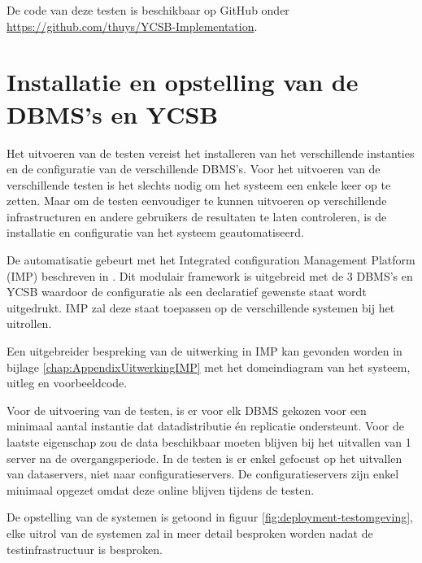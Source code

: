 De code van deze testen is beschikbaar op GitHub onder  \url{https://github.com/thuys/YCSB-Implementation}. 

\section{Installatie en opstelling van de DBMS's en YCSB}
Het uitvoeren van de testen vereist het installeren van het verschillende instanties en de configuratie van de verschillende DBMS's. Voor het uitvoeren van de verschillende testen is het slechts nodig om het systeem een enkele keer op te zetten. Maar om de testen eenvoudiger te kunnen uitvoeren op verschillende infrastructuren en andere gebruikers de resultaten te laten controleren, is de installatie en configuratie van het systeem geautomatiseerd. 

De automatisatie gebeurt met het Integrated configuration Management Platform (IMP) beschreven in \cite{KULeuven-453199}. Dit modulair framework is uitgebreid met de 3 DBMS's en YCSB waardoor de configuratie als een declaratief gewenste staat wordt uitgedrukt. IMP zal deze staat toepassen op de verschillende systemen bij het uitrollen. 

Een uitgebreider bespreking van de uitwerking in IMP kan gevonden worden in bijlage \ref{chap:AppendixUitwerkingIMP} met het domeindiagram van het systeem, uitleg en voorbeeldcode. 

Voor de uitvoering van de testen, is er voor elk DBMS gekozen voor een minimaal aantal instantie dat datadistributie én replicatie ondersteunt. Voor de laatste eigenschap zou de data beschikbaar moeten blijven bij het uitvallen van 1 server na de overgangsperiode. In de testen is er enkel gefocust op het uitvallen van dataservers, niet naar configuratieservers. De configuratieservers zijn enkel minimaal opgezet omdat deze online blijven tijdens de testen.  

De opstelling van de systemen is getoond in figuur \ref{fig:deployment-testomgeving}, elke uitrol van de systemen zal in meer detail besproken worden nadat de testinfrastructuur is besproken.  

